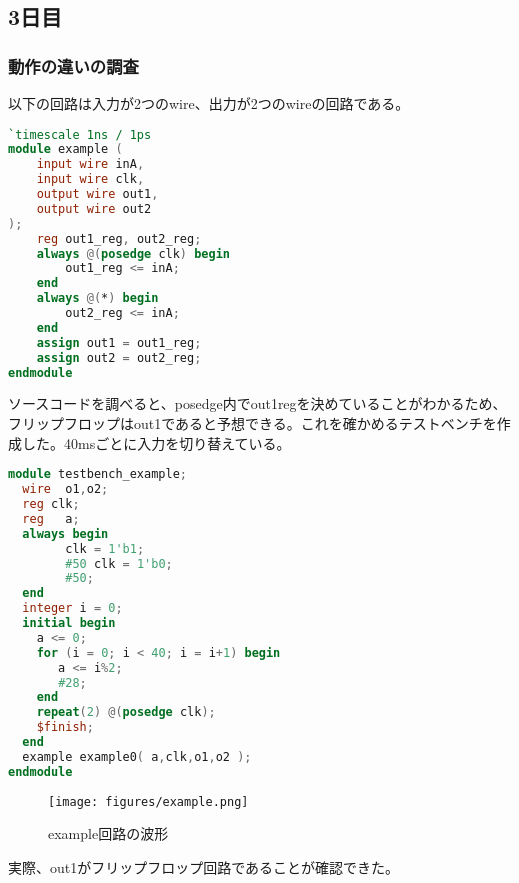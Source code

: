 \documentclass{ltjsarticle}
\begin{document}
\begin{comment}
\subsubsection{4-bit アダーの設計}
フルアダーの組み合わせとしてではなく、1つの回路として4-bitの加算器を作成する。
\begin{lstlisting}[caption=4-bit アダー,language=verilog]
`timescale 1ns / 1ps
module Add4(a,b,s,carry); 
    input [3:0]a,b;
    output [3:0]s;
    output carry;
    assign {carry, s} = a + b;
endmodule    
\end{lstlisting}
4-bitリップルキャリアアダーに比べ、とても簡潔に表現できている。テストベンチは4-bit リップルキャリアアダーと同じものを用いた。
\begin{figure}[H]
    \begin{center}
        \texttt{[image: figures/addripple4.png]}
        \caption{フルアダー回路の波形}
    \end{center}
\end{figure}
結果、同じテストベンチ4-bitリップルキャリアアダーと同一の結果が得られた。
\end{comment}
\subsection{3日目}
\subsubsection{動作の違いの調査}
以下の回路は入力が2つのwire、出力が2つのwireの回路である。
\begin{lstlisting}[caption=*****,language=verilog]
`timescale 1ns / 1ps
module example (
    input wire inA,
    input wire clk,
    output wire out1,
    output wire out2
);
    reg out1_reg, out2_reg;
    always @(posedge clk) begin
        out1_reg <= inA;
    end
    always @(*) begin
        out2_reg <= inA;
    end
    assign out1 = out1_reg;
    assign out2 = out2_reg;
endmodule
\end{lstlisting}
ソースコードを調べると、posedge内でout1regを決めていることがわかるため、フリップフロップはout1であると予想できる。これを確かめるテストベンチを作成した。40msごとに入力を切り替えている。
\begin{lstlisting}[caption=*****,language=verilog]
module testbench_example;
  wire	o1,o2;
  reg clk;
  reg	a;
  always begin
        clk = 1'b1;
        #50 clk = 1'b0;
        #50;
  end
  integer i = 0;
  initial begin
	a <= 0;
	for (i = 0; i < 40; i = i+1) begin
	   a <= i%2;
	   #28;
	end
	repeat(2) @(posedge clk);
	$finish;
  end
  example example0( a,clk,o1,o2 );
endmodule
\end{lstlisting}
\begin{figure}[H]
    \begin{center}
        \texttt{[image: figures/example.png]}
        \caption{example回路の波形}
    \end{center}
\end{figure}
実際、out1がフリップフロップ回路であることが確認できた。
\end{document}
